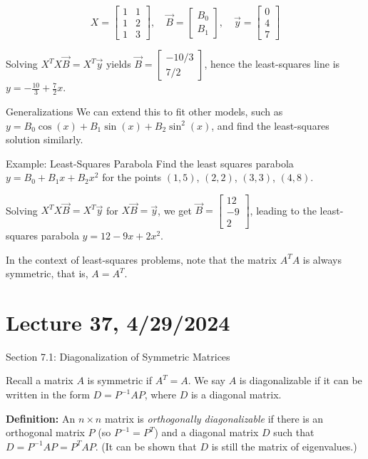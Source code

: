 \documentclass{article}
\begin{document}
\[
X = 
\begin{bmatrix}
1 & 1 \\
1 & 2 \\
1 & 3
\end{bmatrix},
\quad
\vec{B} = 
\begin{bmatrix}
B_0 \\
B_1
\end{bmatrix},
\quad
\vec{y} = 
\begin{bmatrix}
0 \\
4 \\
7
\end{bmatrix}
\]

Solving $X^TX\vec{B} = X^T\vec{y}$ yields $\vec{B} = \begin{bmatrix} -10/3 \\ 7/2 \end{bmatrix}$, hence the least-squares line is $y = -\frac{10}{3} + \frac{7}{2}x$.

Generalizations
We can extend this to fit other models, such as $y = B_0\cos(x) + B_1\sin(x) + B_2\sin^2(x)$, and find the least-squares solution similarly.

Example: Least-Squares Parabola
Find the least squares parabola $y = B_0 + B_1x + B_2x^2$ for the points $(1, 5)$, $(2, 2)$, $(3, 3)$, $(4, 8)$.

Solving $X^TX\vec{B} = X^T\vec{y}$ for $X\vec{B} = \vec{y}$, we get $\vec{B} = \begin{bmatrix} 12 \\ -9 \\ 2 \end{bmatrix}$, leading to the least-squares parabola $y = 12 - 9x + 2x^2$.

In the context of least-squares problems, note that the matrix $A^TA$ is always symmetric, that is, $A = A^T$.


\section{Lecture 37, 4/29/2024}

Section 7.1: Diagonalization of Symmetric Matrices

Recall a matrix $A$ is symmetric if $A^T = A$. We say $A$ is diagonalizable if it can be written in the form $D = P^{-1}AP$, where $D$ is a diagonal matrix.

\textbf{Definition:} An $n \times n$ matrix is \textit{orthogonally diagonalizable} if there is an orthogonal matrix $P$ (so $P^{-1} = P^T$) and a diagonal matrix $D$ such that $D = P^{-1}AP = P^TAP$. (It can be shown that $D$ is still the matrix of eigenvalues.)
\end{document}
